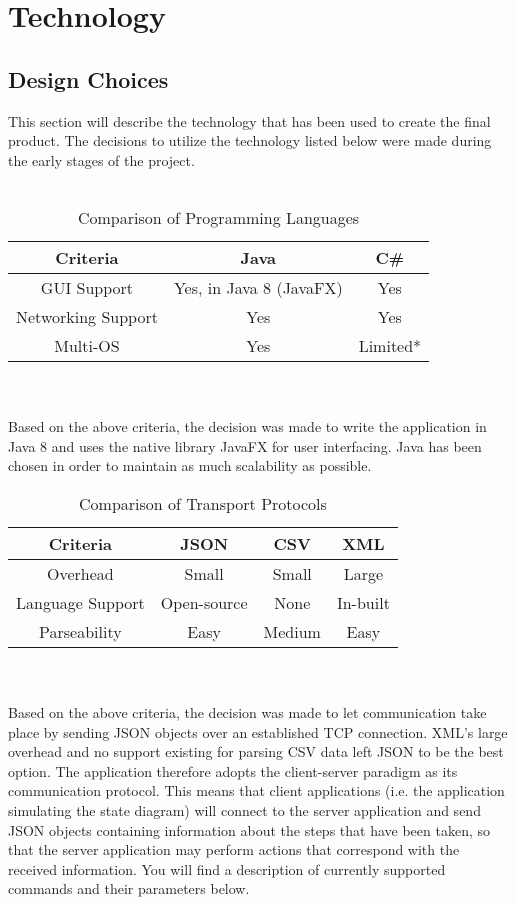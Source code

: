 \documentclass[12pt,a4paper]{article}
\begin{document}
\clearpage
\section{Technology}
\subsection{Design Choices}
This section will describe the technology that has been used to create the final product. The decisions to utilize the technology listed below were made during the early stages of the project.\\\\
\begin{table}[h]
	\begin{center}
		\begin{tabular}{| c || c | c |}
			\hline
			Criteria & Java & C\# \\ \hline
			GUI Support & Yes, in Java 8 (JavaFX) & Yes \\ \hline
			Networking Support & Yes & Yes \\ \hline
			Multi-OS & Yes & Limited* \\ \hline
		\end{tabular}
		\caption{Comparison of Programming Languages}
	\end{center}
\end{table}\\\\
Based on the above criteria, the decision was made to write the application in Java 8 and uses the native library JavaFX for user interfacing. Java has been chosen in order to maintain as much scalability as possible.
\begin{table}[h]
	\begin{center}
		\begin{tabular}{| c || c | c | c |}
			\hline
			Criteria & JSON & CSV & XML \\ \hline
			Overhead & Small & Small & Large \\ \hline
			Language Support & Open-source & None & In-built \\ \hline
			Parseability & Easy & Medium & Easy \\ \hline
		\end{tabular}
		\caption{Comparison of Transport Protocols}
	\end{center}
\end{table}\\\\
Based on the above criteria, the decision was made to let communication take place by sending JSON objects over an established TCP connection. XML's large overhead and no support existing for parsing CSV data left JSON to be the best option. The application therefore adopts the client-server paradigm as its communication protocol. This means that client applications (i.e. the application simulating the state diagram) will connect to the server application and send JSON objects containing information about the steps that have been taken, so that the server application may perform actions that correspond with the received information. You will find a description of currently supported commands and their parameters below.
\end{document}
